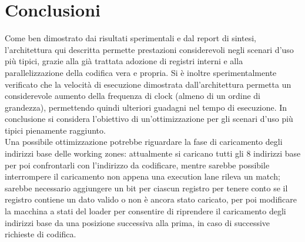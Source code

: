 \documentclass[10pt,english, openany]{book}
\begin{document}
\chapter{Conclusioni}

Come ben dimostrato dai risultati sperimentali e dal report di sintesi, l'architettura qui descritta permette prestazioni considerevoli negli scenari d’uso più tipici, grazie alla già trattata adozione di registri interni e alla parallelizzazione della codifica vera e propria. Si è inoltre sperimentalmente verificato che la velocità di esecuzione dimostrata dall’architettura permetta un considerevole aumento della frequenza di clock (almeno di un ordine di grandezza), permettendo quindi ulteriori guadagni nel tempo di esecuzione.
In conclusione si considera l'obiettivo di un’ottimizzazione per gli scenari d’uso più tipici pienamente raggiunto.\\
Una possibile ottimizzazione potrebbe riguardare la fase di caricamento degli indirizzi base delle working zones: attualmente si caricano tutti gli 8 indirizzi base per poi confrontarli con l’indirizzo da codificare, mentre sarebbe possibile interrompere il caricamento non appena una execution lane rileva un match; sarebbe necessario aggiungere un bit per ciascun registro per tenere conto se il registro contiene un dato valido o non è ancora stato caricato, per poi modificare la macchina a stati del loader per consentire di riprendere il caricamento degli indirizzi base da una posizione successiva alla prima, in caso di successive richieste di codifica.


\pagebreak
\end{document}
